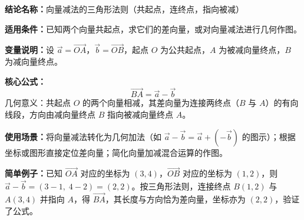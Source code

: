\textbf{结论名称：}向量减法的三角形法则（共起点，连终点，指向被减）

\textbf{适用条件：}已知两个向量共起点，求它们的差向量，或对向量减法进行几何作图。

\textbf{变量说明：}设 $\vec{a}=\overrightarrow{OA}$，$\vec{b}=\overrightarrow{OB}$，起点 $O$ 为公共起点，$A$ 为被减向量终点，$B$ 为减向量终点。

\textbf{核心公式：}
\[
\boxed{\overrightarrow{BA} = \vec{a} - \vec{b}}
\]
几何意义：共起点 $O$ 的两个向量相减，其差向量为连接两终点（$B$ 与 $A$）的有向线段，方向由减向量终点 $B$ 指向被减向量终点 $A$。

\textbf{使用场景：}将向量减法转化为几何加法（如 $\vec{a}-\vec{b}=\vec{a}+(-\vec{b})$ 的图示）；根据坐标或图形直接定位差向量；简化向量加减混合运算的作图。

\textbf{简单例子：}已知 $\overrightarrow{OA}$ 对应的坐标为 $(3,4)$，$\overrightarrow{OB}$ 对应的坐标为 $(1,2)$，则 $\vec{a} - \vec{b} = (3-1,\;4-2) = (2,2)$。按三角形法则，连接终点 $B(1,2)$ 与 $A(3,4)$ 并指向 $A$，得 $\overrightarrow{BA}$，其长度与方向恰为差向量，坐标亦为 $(2,2)$，验证了公式。